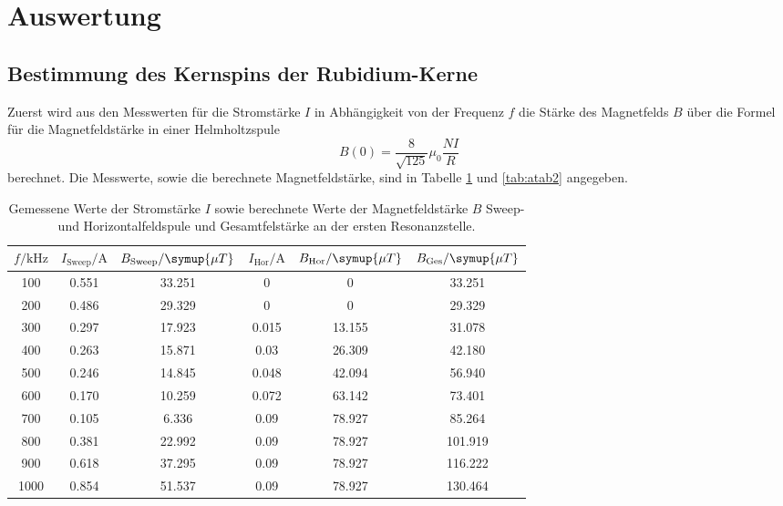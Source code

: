 \section{Auswertung}
\subsection{Bestimmung des Kernspins der Rubidium-Kerne}
Zuerst wird aus den Messwerten für die Stromstärke $I$ in Abhängigkeit von der Frequenz $f$ die Stärke des Magnetfelds 
$B$ über die Formel für die Magnetfeldstärke in einer Helmholtzspule
\begin{equation*}
    B(0) = \frac{8}{\sqrt{125}}\mu_0\frac{N I}{R}
\end{equation*}
berechnet. Die Messwerte, sowie die berechnete Magnetfeldstärke, sind in Tabelle \ref{tab:atab1} und \ref{tab:atab2} angegeben.
\FloatBarrier
\begin{table}[h]
    \centering
    \caption{Gemessene Werte der Stromstärke $I$ sowie berechnete Werte der Magnetfeldstärke $B$ Sweep- und Horizontalfeldspule und Gesamtfelstärke an der ersten Resonanzstelle.}
    \label{tab:atab1}
    \begin{tabular}{c c c c c c}
        \toprule
        {$f / \text{kHz}$} & {$I_{\text{Sweep}} / \text{A}$} & {$B_{\text{Sweep}} / \symup{\mu T}$} & {$I_{\text{Hor}} / \text{A}$} & {$B_{\text{Hor}} / \symup{\mu T}$} & {$B_{\text{Ges}} / \symup{\mu T}$} \\
        \midrule
        100  & 0.551 & 33.251 & 0     & 0      & 33.251 \\
        200  & 0.486 & 29.329 & 0     & 0      & 29.329 \\
        300  & 0.297 & 17.923 & 0.015 & 13.155 & 31.078 \\
        400  & 0.263 & 15.871 & 0.03  & 26.309 & 42.180 \\
        500  & 0.246 & 14.845 & 0.048 & 42.094 & 56.940 \\
        600  & 0.170 & 10.259 & 0.072 & 63.142 & 73.401 \\
        700  & 0.105 &  6.336 & 0.09  & 78.927 & 85.264 \\
        800  & 0.381 & 22.992 & 0.09  & 78.927 & 101.919 \\
        900  & 0.618 & 37.295 & 0.09  & 78.927 & 116.222 \\
        1000 & 0.854 & 51.537 & 0.09  & 78.927 & 130.464 \\
        \bottomrule
    \end{tabular}
\end{table}
